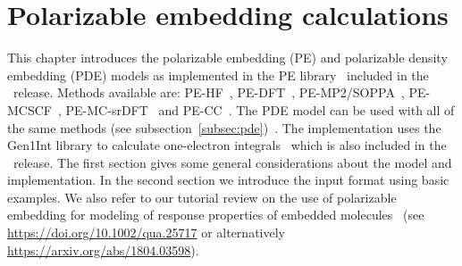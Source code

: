 \chapter{Polarizable embedding calculations}\label{ch:embedding}

This chapter introduces the polarizable embedding (PE)\cite{pemodel1,pemodel2} and
polarizable density embedding (PDE)\cite{pde1,pde2,pde3} models as implemented
in the PE library~\cite{pelib} included in the \latestrelease\ release.
Methods available are: PE-HF~\cite{pescf}, PE-DFT~\cite{pescf},
PE-MP2/SOPPA~\cite{pesoppa}, PE-MCSCF~\cite{pemcscf}, PE-MC-srDFT~\cite{pesrdft}
and PE-CC~\cite{pecc}.
The PDE model can be used with all of the same methods (see subsection~\ref{subsec:pde})~\cite{pde1,pde2,pde3,pdecc}.
The implementation uses the Gen1Int library to calculate one-electron
integrals~\cite{gen1int} which is also included in the \latestrelease\ release. The
first section gives some general considerations about the model and
implementation. In the second section we introduce the input format using
basic examples.
We also refer to our tutorial review on the use of polarizable embedding for modeling of response
properties of embedded molecules~\cite{petutorial} (see \url{https://doi.org/10.1002/qua.25717}
or alternatively \url{https://arxiv.org/abs/1804.03598}).

